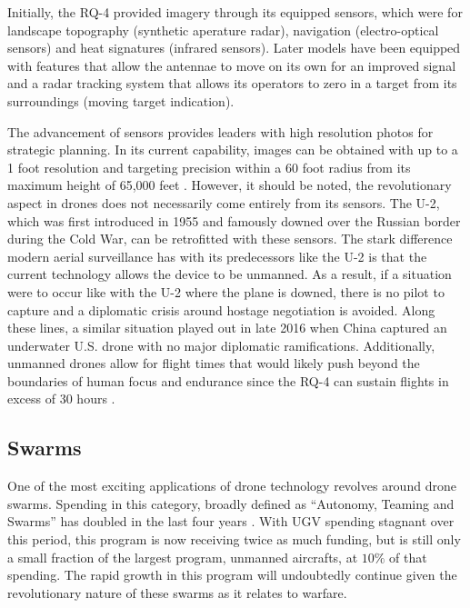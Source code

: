 \documentclass[sigconf]{acmart}
\begin{document}
Initially, the RQ-4 provided imagery through its equipped sensors, which were for landscape topography (synthetic aperature radar), navigation (electro-optical sensors) and heat signatures (infrared sensors). Later models have been equipped with features that allow the antennae to move on its own for an improved signal and a radar tracking system that allows its operators to zero in a target from its surroundings (moving target indication). 

The advancement of sensors provides leaders with high resolution photos for strategic planning. In its current capability, images can be obtained with up to a 1 foot resolution and targeting precision within a 60 foot radius from its maximum height of 65,000 feet \cite{forbesdrone}. However, it should be noted, the revolutionary aspect in drones does not necessarily come entirely from its sensors. The U-2, which was first introduced in 1955 and famously downed over the Russian border during the Cold War, can be retrofitted with these sensors. The stark difference modern aerial surveillance has with its predecessors like the U-2 is that the current technology allows the device to be unmanned. As a result, if a situation were to occur like with the U-2 where the plane is downed, there is no pilot to capture and a diplomatic crisis around hostage negotiation is avoided. Along these lines, a similar situation played out in late 2016 when China captured an underwater U.S. drone with no major diplomatic ramifications. Additionally, unmanned drones allow for flight times that would likely push beyond the boundaries of human focus and endurance since the RQ-4 can sustain flights in excess of 30 hours \cite{foxtrot}.

\subsection{Swarms}
One of the most exciting applications of drone technology revolves around drone swarms. Spending in this category, broadly defined as ``Autonomy, Teaming and Swarms'' has doubled in the last four years \cite{dronebudget}. With UGV spending stagnant over this period, this program is now receiving twice as much funding, but is still only a small fraction of the largest program, unmanned aircrafts, at $10\%$ of that spending. The rapid growth in this program will undoubtedly continue given the revolutionary nature of these swarms as it relates to warfare.
\end{document}
